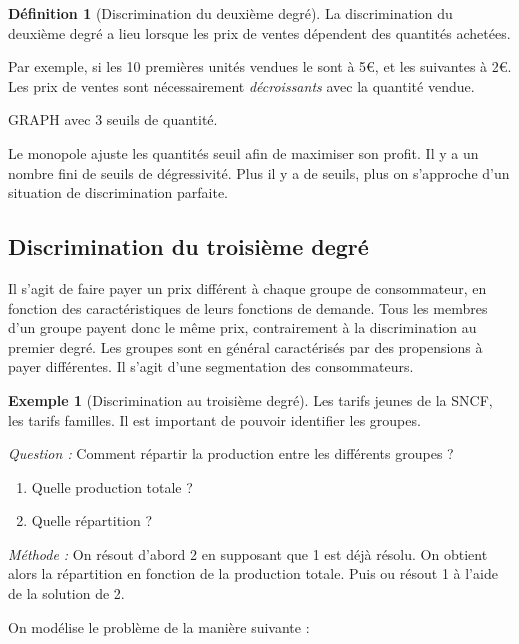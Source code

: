 \documentclass[
]{book}
\providecommand{\tightlist}{%
  \setlength{\itemsep}{0pt}\setlength{\parskip}{0pt}}
\theoremstyle{definition}
\newtheorem{definition}{Définition}[chapter]
\theoremstyle{definition}
\newtheorem{example}{Exemple}[chapter]
\theoremstyle{definition}
\theoremstyle{definition}
\theoremstyle{remark}
\begin{document}
\begin{definition}[Discrimination du deuxième degré]
La discrimination du deuxième degré a lieu lorsque les prix de ventes dépendent des quantités achetées.
\end{definition}

Par exemple, si les 10 premières unités vendues le sont à 5€, et les suivantes à 2€.
Les prix de ventes sont nécessairement \emph{décroissants} avec la quantité vendue.

GRAPH avec 3 seuils de quantité.

Le monopole ajuste les quantités seuil afin de maximiser son profit.
Il y a un nombre fini de seuils de dégressivité.
Plus il y a de seuils, plus on s'approche d'un situation de discrimination parfaite.

\hypertarget{discrimination-du-troisiuxe8me-degruxe9}{%
\subsection{Discrimination du troisième degré}\label{discrimination-du-troisiuxe8me-degruxe9}}

Il s'agit de faire payer un prix différent à chaque groupe de consommateur, en fonction des caractéristiques de leurs fonctions de demande.
Tous les membres d'un groupe payent donc le même prix, contrairement à la discrimination au premier degré.
Les groupes sont en général caractérisés par des propensions à payer différentes.
Il s'agit d'une segmentation des consommateurs.

\begin{example}[Discrimination au troisième degré]
Les tarifs jeunes de la SNCF, les tarifs familles.
Il est important de pouvoir identifier les groupes.
\end{example}

\emph{Question :} Comment répartir la production entre les différents groupes ?

\begin{enumerate}
\def\labelenumi{\arabic{enumi}.}
\tightlist
\item
  Quelle production totale ?
\item
  Quelle répartition ?
\end{enumerate}

\emph{Méthode :} On résout d'abord 2 en supposant que 1 est déjà résolu.
On obtient alors la répartition en fonction de la production totale.
Puis ou résout 1 à l'aide de la solution de 2.

On modélise le problème de la manière suivante :
\end{document}
